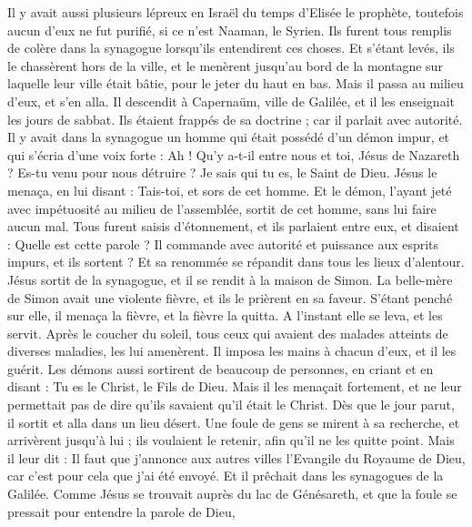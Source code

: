 \begin{multicols}{2}
Il y avait aussi plusieurs lépreux en Israël du temps d'Elisée le prophète, toutefois aucun d'eux ne fut purifié, si ce n’est Naaman, le Syrien.
Ils furent tous remplis de colère dans la synagogue lorsqu’ils entendirent ces choses.
Et s'étant levés, ils le chassèrent hors de la ville, et le menèrent jusqu'au bord de la montagne sur laquelle leur ville était bâtie, pour le jeter du haut en bas.
Mais il passa au milieu d'eux, et s'en alla.
Il descendit à Capernaüm, ville de Galilée, et il les enseignait les jours de sabbat.
Ils étaient frappés de sa doctrine ; car il parlait avec autorité.
Il y avait dans la synagogue un homme qui était possédé d'un démon impur, et qui s'écria d’une voix forte :
Ah ! Qu’y a-t-il entre nous et toi, Jésus de Nazareth ? Es-tu venu pour nous détruire ? Je sais qui tu es, le Saint de Dieu.
Jésus le menaça, en lui disant : Tais-toi, et sors de cet homme. Et le démon, l’ayant jeté avec impétuosité au milieu de l'assemblée, sortit de cet homme, sans lui faire aucun mal.
Tous furent saisis d'étonnement, et ils parlaient entre eux, et disaient : Quelle est cette parole ? Il commande avec autorité et puissance aux esprits impurs, et ils sortent ?
Et sa renommée se répandit dans tous les lieux d'alentour.
Jésus sortit de la synagogue, et il se rendit à la maison de Simon. La belle-mère de Simon avait une violente fièvre, et ils le prièrent en sa faveur.
S'étant penché sur elle, il menaça la fièvre, et la fièvre la quitta. A l’instant elle se leva, et les servit.
Après le coucher du soleil, tous ceux qui avaient des malades atteints de diverses maladies, les lui amenèrent. Il imposa les mains à chacun d'eux, et il les guérit.
Les démons aussi sortirent de beaucoup de personnes, en criant et en disant : Tu es le Christ, le Fils de Dieu. Mais il les menaçait fortement, et ne leur permettait pas de dire qu'ils savaient qu'il était le Christ.
Dès que le jour parut, il sortit et alla dans un lieu désert. Une foule de gens se mirent à sa recherche, et arrivèrent jusqu’à lui ; ils voulaient le retenir, afin qu’il ne les quitte point.
Mais il leur dit : Il faut que j’annonce aux autres villes l’Evangile du Royaume de Dieu, car c’est pour cela que j’ai été envoyé.
Et il prêchait dans les synagogues de la Galilée.
\VerseOne{}Comme Jésus se trouvait auprès du lac de Génésareth, et que la foule se pressait pour entendre la parole de Dieu,

\end{multicols}
